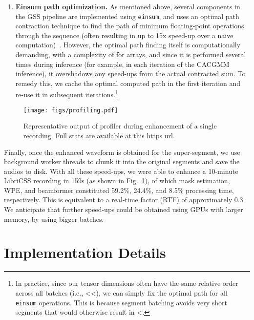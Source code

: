\documentclass[a4paper]{article}
\begin{document}
\begin{enumerate}[wide, labelwidth=!, labelindent=0pt]
\item \textbf{Einsum path optimization.} As mentioned above, several components in the GSS pipeline are implemented using \texttt{einsum}, and uses an optimal path contraction technique to find the path of minimum floating-point operations through the sequence (often resulting in up to 15x speed-up over a naive computation)~\cite{Smith2018opteinsum}. However, the optimal path finding itself is computationally demanding, with a complexity of  for  arrays, and since it is performed several times during inference (for example, in each iteration of the CACGMM inference), it overshadows any speed-ups from the actual contracted sum. To remedy this, we cache the optimal computed path in the first iteration and re-use it in subsequent iterations.\footnote{In practice, since our tensor dimensions often have the same relative order across all batches (i.e., <<), we can simply fix the optimal path for all \texttt{einsum} operations. This is because segment batching avoids very short segments that would otherwise result in <.}
\end{enumerate}

\begin{figure}[t]
    \centering
    \texttt{[image: figs/profiling.pdf]}
    \vspace{-1em}
    \caption{Representative output of profiler during enhancement of a single recording. Full stats are available at \href{https://github.com/desh2608/gss/blob/master/test.pstats}{this https url}.}
    \label{fig:profiling}
\end{figure}

Finally, once the enhanced waveform is obtained for the super-segment, we use background worker threads to chunk it into the original segments and save the audios to disk. With all these speed-ups, we were able to enhance a 10-minute LibriCSS recording in 159s (as shown in Fig.~\ref{fig:profiling}), of which mask estimation, WPE, and beamformer constituted 59.2\%, 24.4\%, and 8.5\% processing time, respectively. This is equivalent to a real-time factor (RTF) of approximately 0.3. We anticipate that further speed-ups could be obtained using GPUs with larger memory, by using bigger batches.


\section{Implementation Details}
\label{sec:details}
\end{document}
